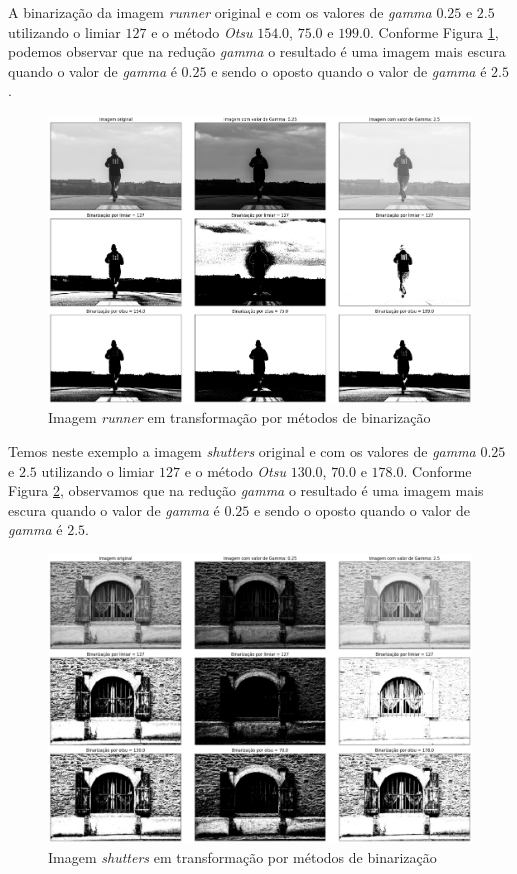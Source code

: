 A binarização da imagem \textit{runner} original e com os valores de \textit{gamma} $0.25$ e $2.5$ utilizando o limiar $127$ e o método \textit{Otsu} $154.0$, $75.0$ e $199.0$.
Conforme Figura \ref{fig:binarizacao-runner}, podemos observar que na redução \textit{gamma} o resultado é uma imagem mais escura quando o valor de \textit{gamma} é $0.25$ e sendo o oposto quando o valor de \textit{gamma} é $2.5$.

\begin{figure}[h!]
    \includegraphics[width=1\linewidth]{Elementos/Figuras/resultados-binarizacao-runner.png}
    \caption{Imagem \textit{runner} em transformação por métodos de binarização}
    \label{fig:binarizacao-runner}
\end{figure}

Temos neste exemplo a imagem \textit{shutters} original e com os valores de \textit{gamma} $0.25$ e $2.5$ utilizando o limiar $127$ e o método \textit{Otsu} $130.0$, $70.0$ e $178.0$.
Conforme Figura \ref{fig:binarizacao-shutters}, observamos que na redução \textit{gamma} o resultado é uma imagem mais escura quando o valor de \textit{gamma} é $0.25$ e sendo o oposto quando o valor de \textit{gamma} é $2.5$.

\begin{figure}[h!]
    \includegraphics[width=1\linewidth]{Elementos/Figuras/resultados-binarizacao-shutters.png}
    \caption{Imagem \textit{shutters} em transformação por métodos de binarização}
    \label{fig:binarizacao-shutters}
\end{figure}


